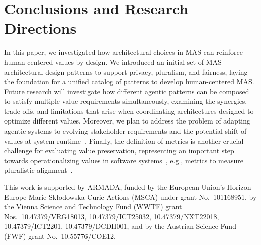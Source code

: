 \documentclass[sigconf,nonacm]{acmart}
\begin{document}
\section{Conclusions and Research Directions}
\label{sec:conclusions}
In this paper, we investigated how architectural choices in MAS can reinforce human-centered values by design.
We introduced an initial set of MAS architectural design patterns to support privacy, pluralism, and fairness, laying the foundation for a unified catalog of patterns to develop human-centered MAS.
Future research will investigate how different agentic patterns can be composed to satisfy multiple value requirements simultaneously, examining the synergies, trade-offs, and limitations that arise when coordinating architectures designed to optimize different values.
Moreover, we plan to address the problem of adapting agentic systems to evolving stakeholder requirements and the potential shift of values at system runtime~\cite{gavidia-calderon2022what,bennaceur2023valuesruntime}.
Finally, the definition of metrics is another crucial challenge for evaluating value preservation, representing an important step towards operationalizing values in software systems~\cite{shahin2022operationalizing}, e.g., metrics to measure pluralistic alignment~\cite{sorensen2024position}.

\begin{acks}
This work is supported by ARMADA, funded by the European Union's Horizon Europe  Marie Sk\l{}odowska-Curie Actions (MSCA) under grant No.\ 101168951, by the Vienna Science and Technology Fund (WWTF) grant Nos.\ 10.47379/VRG18013, 10.47379/ICT25032, 10.47379/NXT22018, 10.47379/ICT2201, 10.47379/DCDH001, and by the Austrian Science Fund (FWF) grant No.\ 10.55776/COE12.
\end{acks}



\end{document}
